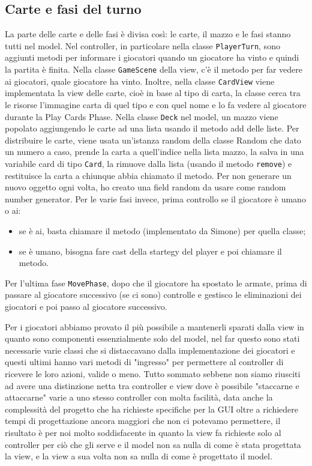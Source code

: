 \documentclass[a4paper,12pt]{report}
\begin{document}
\subsection{Carte e fasi del turno}
La parte delle carte e delle fasi è divisa così: le carte, il mazzo e le fasi stanno tutti nel model. Nel controller, in particolare nella classe \texttt{PlayerTurn}, sono aggiunti metodi per informare i giocatori quando un giocatore ha vinto e quindi la partita è finita. Nella classe \texttt{GameScene} della view, c'è il metodo per far vedere ai giocatori, quale giocatore ha vinto. Inoltre, nella classe \texttt{CardView} viene implementata la view delle carte, cioè in base al tipo di carta, la classe cerca tra le risorse l'immagine carta di quel tipo e con quel nome e lo fa vedere al giocatore durante la Play Cards Phase.
Nella classe \texttt{Deck} nel model, un mazzo viene popolato aggiungendo le carte ad una lista usando il metodo add delle liste. Per distribuire le carte, viene usata un'istanza random della classe Random che dato un numero a caso, prende la carta a quell'indice nella lista mazzo, la salva in una variabile card di tipo \texttt{Card}, la rimuove dalla lista (usando il metodo \texttt{remove}) e restituisce la carta a chiunque abbia chiamato il metodo. Per non generare un nuovo oggetto ogni volta, ho creato una field random da usare come random number generator.
Per le varie fasi invece, prima controllo se il giocatore è umano o ai:
\begin{itemize} 
    \item se è ai, basta chiamare il metodo (implementato da Simone) per quella classe;
    \item se è umano, bisogna fare cast della startegy del player e poi chiamare il metodo.
\end{itemize}
Per l'ultima fase \texttt{MovePhase}, dopo che il giocatore ha spostato le armate, prima di passare al giocatore successivo (se ci sono) controlle e gestisco le eliminazioni dei giocatori e poi passo al giocatore successivo.

Per i giocatori abbiamo provato il più possibile a mantenerli sparati dalla view in quanto sono componenti essenzialmente solo del model, nel far questo sono stati necessarie varie classi che si distaccavano dalla implementazione dei giocatori e questi ultimi hanno vari metodi di "ingresso" per permettere al controller di ricevere le loro azioni, valide o meno.
Tutto sommato sebbene non siamo riusciti ad avere una distinzione netta tra controller e view dove è possibile "staccarne e attaccarne" varie a uno stesso controller con molta facilità, data anche la complessità del progetto che ha richieste specifiche per la GUI oltre a richiedere tempi di progettazione ancora maggiori che non ci potevamo permettere, il risultato è per noi molto soddisfacente in quanto la view fa richieste solo al controller per ciò che gli serve e il model non sa nulla di come è stata progettata la view, e la view a sua volta non sa nulla di come è progettato il model.
\end{document}
